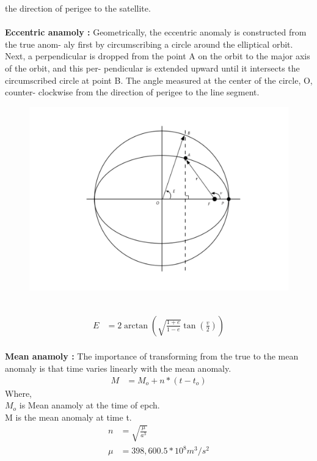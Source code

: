 \documentclass[journal,15pt,onecolumn]{IEEEtran}
\begin{document}
the direction of perigee to the satellite.\\ 
\\
\textbf{Eccentric anamoly :} Geometrically, the eccentric anomaly is constructed from the true anom-
aly first by circumscribing a circle around the elliptical orbit. Next, a perpendicular
is dropped from the point A on the orbit to the major axis of the orbit, and this per-
pendicular is extended upward until it intersects the circumscribed circle at point B. The angle measured at the center of the circle, O, counter-
clockwise from the direction of perigee to the line segment.
\begin{figure}
  \includegraphics[scale=0.4]{./figs/2.pdf}
  \end{figure}
 \vspace{30cm} \\
 \begin{align}
E&=2\arctan (\sqrt{\frac{1+e}{1-e}}\tan(\frac{v}{2})  )
 \end{align}
 \\
 \textbf{Mean anamoly :} The importance of transforming from the true to the mean
 anomaly is that time varies linearly with the mean anomaly.\\
 \begin{align}
  M&=M_o+n*(t-t_o)
 \end{align}
 Where,\\
 $M_o$ is Mean anamoly at the time of epch.\\
 M is the mean anomaly at time t.\\
 \begin{align}
  n&=\sqrt{\frac{\mu }{a^3}} \\
  \mu&=398,600.5 * 10^8 m^3/s^2
 \end{align} 
\end{document}
